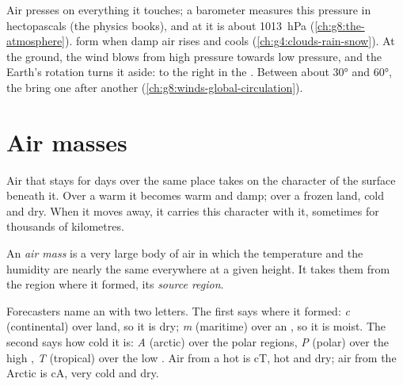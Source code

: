\begin{recall}
Air presses on everything it touches; a barometer measures this pressure
in hectopascals (the physics books), and at  it is about
\qty{1013}{hPa} (\cref{ch:g8:the-atmosphere}).  form when damp air
rises and cools (\cref{ch:g4:clouds-rain-snow}). At the ground, the wind
blows from high pressure towards low pressure, and the Earth's rotation
turns it aside: to the right in the . Between about
\ang{30} and \ang{60}, the  bring one  after another
(\cref{ch:g8:winds-global-circulation}).
\end{recall}

\section{Air masses}

Air that stays for days over the same place takes on the character of
the surface beneath it. Over a warm  it becomes warm and damp; over a
frozen land, cold and dry. When it moves away, it carries this character
with it, sometimes for thousands of kilometres.

\begin{definition}\label{def:g8:fronts-and-weather-maps:air-mass}
An \emph{air mass} is a very large body of air in which
the temperature and the humidity are nearly the same everywhere at a
given height. It takes them from the region where it formed, its
\emph{source region}.
\end{definition}

Forecasters name an  with two letters. The first says where it
formed: \emph{c} (continental) over land, so it is dry; \emph{m}
(maritime) over an , so it is moist. The second says how cold it
is: \emph{A} (arctic) over the polar regions, \emph{P} (polar) over the
high , \emph{T} (tropical) over the low . Air from a
hot  is cT, hot and dry; air from the Arctic is cA, very cold and
dry.


